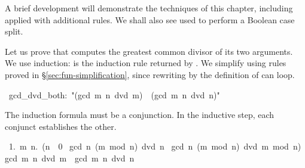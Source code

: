 %
A brief development will demonstrate the techniques of this chapter,
including  applied with additional rules.  We shall also see
 used to perform a Boolean case split.

Let us prove that  computes the greatest common
divisor of its two arguments.  
%
We use induction:  is the
induction rule returned by .  We simplify using
rules proved in {\S}\ref{sec:fun-simplification}, since rewriting by the
definition of  can loop.
\begin{isabelle}
\ gcd\_dvd\_both:\ "(gcd\ m\ n\ dvd\ m)\ \isasymand \ (gcd\ m\ n\ dvd\ n)"
\end{isabelle}
The induction formula must be a conjunction.  In the
inductive step, each conjunct establishes the other. 
\begin{isabelle}
\ 1.\ \isasymAnd m\ n.\ (n\ \isasymnoteq \ 0\ \isasymLongrightarrow \isanewline
{}gcd\ n\ (m\ mod\ n)\ dvd\ n\ \isasymand \isanewline
{}gcd\ n\ (m\ mod\ n)\ dvd\ m\ mod\ n)\ \isasymLongrightarrow \isanewline
{}gcd\ m\ n\ dvd\ m\ \isasymand \ gcd\ m\ n\ dvd\ n%
\end{isabelle}

